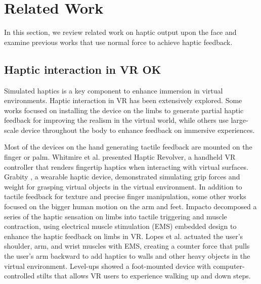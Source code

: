\chapter{Related Work} \label{chapter:related_work}
In this section, we review related work on haptic output upon the face and examine previous works that use normal force to achieve haptic feedback.

\section{Haptic interaction in VR OK}
Simulated haptics is a key component to enhance immersion in virtual environments. Haptic interaction in VR has been extensively explored. Some works focused on installing the device on the limbs to generate partial haptic feedback for improving the realism in the virtual world, while others use large-scale device throughout the body to enhance feedback on immersive experiences.

Most of the devices on the hand generating tactile feedback are mounted on the finger or palm. Whitmire et al. \cite{hapticrevolver} presented Haptic Revolver, a handheld VR controller that renders fingertip haptics when interacting with virtual surfaces. Grabity \cite{Grabity}, a wearable haptic device, demonstrated simulating grip forces and weight for grasping virtual objects in the virtual environment. In addition to tactile feedback for texture and precise finger manipulation, some other works focused on the bigger human motion on the arm and feet. Impacto \cite{Impacto} decomposed a series of the haptic sensation on limbs into tactile triggering and muscle contraction, using electrical muscle stimulation (EMS) embedded design to enhance the haptic feedback on limbs in VR. Lopes et al. \cite{VRwalls} actuated the user's shoulder, arm, and wrist muscles with EMS, creating a counter force that pulls the user's arm backward to add haptics to walls and other heavy objects in the virtual environment. Level-ups \cite{Level-up} showed a foot-mounted device with computer-controlled stilts that allows VR users to experience walking up and down steps.

